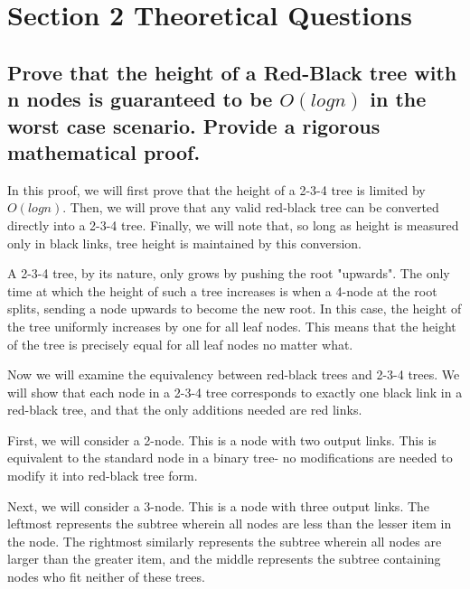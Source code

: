 \documentclass[12pt]{amsart}
\title{}
\author{Jordan Dehmel, Kate Eckhart, Logan Humbert, Darrin Miller}
\date{2023}
\begin{document}
\maketitle

\section{Section 2 Theoretical Questions}

    \subsection{Prove that the height of a Red-Black tree with
    n nodes is guaranteed to be $O(log n)$ in the worst
    case scenario. Provide a rigorous mathematical proof.}
    
    In this proof, we will first prove that the height of a
    2-3-4 tree is limited by $O(log n)$. Then, we will prove
    that any valid red-black tree can be converted directly into
    a 2-3-4 tree. Finally, we will note that, so long as height
    is measured only in black links, tree height is maintained
    by this conversion.

    A 2-3-4 tree, by its nature, only grows by pushing the root
    "upwards". The only time at which the height of such a tree
    increases is when a 4-node at the root splits, sending a
    node upwards to become the new root. In this case, the
    height of the tree uniformly increases by one for all leaf
    nodes. This means that the height of the tree is precisely
    equal for all leaf nodes no matter what.

    Now we will examine the equivalency between red-black trees
    and 2-3-4 trees. We will show that each node in a 2-3-4 tree
    corresponds to exactly one black link in a red-black tree,
    and that the only additions needed are red links.

    First, we will consider a 2-node. This is a node with two
    output links. This is equivalent to the standard node in a
    binary tree- no modifications are needed to modify it into
    red-black tree form.

    Next, we will consider a 3-node. This is a node with three
    output links. The leftmost represents the subtree wherein
    all nodes are less than the lesser item in the node. The
    rightmost similarly represents the subtree wherein all nodes
    are larger than the greater item, and the middle represents
    the subtree containing nodes who fit neither of these trees.
\end{document}
